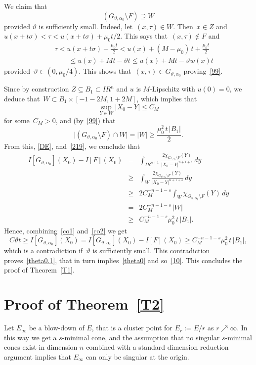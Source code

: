 \documentclass[11pt]{amsart}
\begin{document}
We claim that
\begin{equation}\label{99}
(G_{{\vartheta},\alpha_0}\setminus F)\supseteq W
\end{equation}
provided ${\vartheta}$ is sufficiently small.
Indeed, let~$(x,\tau)\in W$. Then~$x\in Z$ and~$u(x+t\sigma)<\tau<u(x+t\sigma)+\mu_0t/2$.
This says that~$(x,\tau)\not\in F$ and
\begin{eqnarray*}
&& \tau<u(x+t\sigma)-\frac{\mu_0t}{2}<
u(x)+(M-\mu_0)\,t+\frac{\mu_0t}{2}
\\ &&\qquad{\leqslant}
u(x)+Mt-{\vartheta} t{\leqslant} u(x)+Mt-{\vartheta} w(x)t\end{eqnarray*}
provided~${\vartheta}\in (0,\mu_0/4)$. This shows that~$(x,\tau)\in G_{{\vartheta},\alpha_0}$
proving~\eqref{99}.

Since by construction $Z\subseteq B_1\subset{{I\!\!R}}^n$
and $u$ is $M$-Lipschitz with $u(0)=0$, we deduce that~$W\subset B_1\times [-1-2M,1+2M]$,
which implies that 
$$ \sup_{Y\in W} |X_0-Y|{\leqslant} C_M$$
for some~$C_M>0$, and (by~\eqref{99}) that
$$ \big|(G_{{\vartheta},\alpha_0}\setminus F)\cap W\big|= |W|{\geqslant} \frac{\mu_0^2\,t\,|B_1|}{2}.$$
{F}rom this, \eqref{DE}, and~\eqref{219}, we conclude that
\begin{eqnarray*}
I[G_{{\vartheta},\alpha_0}](X_0) -I[F](X_0) &=&
\int_{{{I\!\!R}}^{n+1}}\frac{2\chi_{G_{{\vartheta},\alpha_0}\setminus F}(Y)}{|X_0-Y|^{n+1+s}}\,dy\\
&{\geqslant}&
\int_{W}\frac{2\chi_{G_{{\vartheta},\alpha_0}\setminus F}(Y)}{|X_0-Y|^{n+1+s}}\,dy\\
&{\geqslant}& 2 C_M^{-n-1-s}
\int_{W} \chi_{G_{{\vartheta},\alpha_0}\setminus F}(Y)\,dy\\
&=& 2 C_M^{-n-1-s}\,|W|\\
&{\geqslant}& 
C_M^{-n-1-s}\mu_0^2\,t\,|B_1|.
\end{eqnarray*}
Hence, 
combining~\eqref{co1} and~\eqref{co2} we get
\begin{equation}\label{3BIS} C{\vartheta} t{\geqslant}
I[G_{{\vartheta},\alpha_0}](X_0)=
I[G_{{\vartheta},\alpha_0}](X_0)-
I[F](X_0){\geqslant}
C_M^{-n-1-s}\mu_0^2\,t\,|B_1|,\end{equation}
which is a contradiction if~${\vartheta}$ is sufficiently small.
This contradiction proves~\eqref{theta0.1},
that in turn implies~\eqref{theta0} and so~\eqref{10}.
This concludes the proof of Theorem~\ref{T1}.

\section{Proof of Theorem~\ref{T2}}\label{S:3}
Let $E_\infty$ be a blow-down of $E$, that is a cluster point for $E_r:=E/r$
as $r \nearrow \infty$.
In this way we get a $s$-minimal cone, and the assumption that 
no singular $s$-minimal cones exist in dimension $n$ combined with a standard dimension reduction argument
implies that $E_\infty$ can only be singular at the origin.
\end{document}
